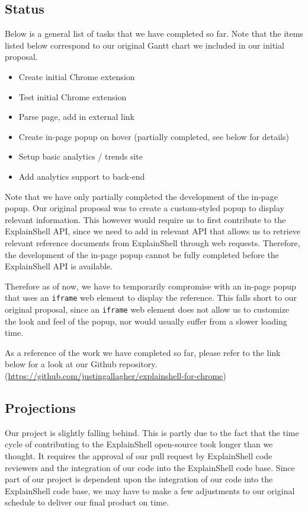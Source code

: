 \documentclass[11pt]{article}
\begin{document}
\subsection{Status}

Below is a general list of tasks that we have completed so far. 
Note that the items listed below correspond to our original Gantt chart we
included in our initial proposal.
\begin{itemize}
  \item Create initial Chrome extension
  \item Test initial Chrome extension
  \item Parse page, add in external link
  \item Create in-page popup on hover (partially completed, see below 
  for details)
  \item Setup basic analytics / trends site
  \item Add analytics support to back-end 
\end{itemize}
Note that we have only partially completed the development of the in-page
popup. Our original proposal was to create a custom-styled popup to display
relevant information. This however would require us to first contribute to the
ExplainShell API, since we need to add in relevant API that allows us to
retrieve relevant reference documents from ExplainShell through web requests.
Therefore, the development of the in-page popup cannot be fully completed
before the ExplainShell API is available.

Therefore as of now, we have to temporarily compromise with an in-page popup 
that uses an \texttt{iframe} web element to display the reference. This falls
short to our original proposal, since an \texttt{iframe} web element does not
allow us to customize the look and feel of the popup, nor would usually suffer
from a slower loading time.

As a reference of the work we have completed so far, please refer to the link
 below for a look at our Github repository.
(\url{https://github.com/justingallagher/explainshell-for-chrome})

\subsection{Projections}
Our project is slightly falling behind. This is partly due to the fact that
the time cycle of contributing to the ExplainShell open-source took longer 
than we thought. It requires the approval of our pull request by
ExplainShell code reviewers and the
integration of our code into the ExplainShell code base. Since part of our
project is dependent upon the integration of our code into the ExplainShell
code base, we may have to make a few adjustments to our original schedule
to deliver our final product on time.
\end{document}
